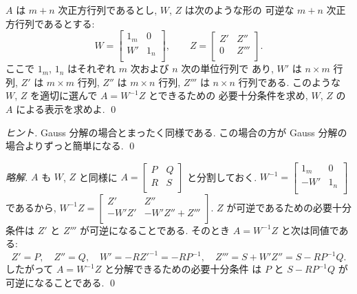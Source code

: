 \documentclass[12pt,twoside]{jarticle}
\newcommand\commentout[1]{#1}
\newcommand\commentout[1]{}
\begin{document}

\begin{question}
  \label{q:Gauss-decomp-2}
  $A$ は $m+n$ 次正方行列であるとし, $W$, $Z$ は次のような形の
  可逆な $m+n$ 次正方行列であるとする:
  \begin{equation*}
    W = 
    \begin{bmatrix}
      1_m & 0   \\
      W'  & 1_n \\
    \end{bmatrix},
    \qquad
    Z = 
    \begin{bmatrix}
      Z' & Z'' \\
      0  & Z''' \\
    \end{bmatrix}.
  \end{equation*}
  ここで $1_m$, $1_n$ はそれぞれ $m$ 次および $n$ 次の単位行列で
  あり, $W'$ は $n\times m$ 行列, $Z'$ は $m\times m$ 行列, 
  $Z''$ は $m\times n$ 行列, $Z'''$ は $n\times n$ 行列である.
  このような $W$, $Z$ を適切に選んで $A=W^{-1}Z$ とできるための
  必要十分条件を求め, $W$, $Z$ の $A$ による表示を求めよ.
  \qed
\end{question}

\begin{proof}[ヒント]
  Gauss 分解の場合とまったく同様である.
  この場合の方が Gauss 分解の場合よりずっと簡単になる.
  \qed
\end{proof}

\commentout{
\begin{proof}[略解]
  $A$ も $W$, $Z$ と同様に $A=
  \begin{bmatrix}
    P & Q \\
    R & S \\
  \end{bmatrix}$ と分割しておく.  $W^{-1}=
  \begin{bmatrix}
    1_m & 0 \\
    -W' & 1_n \\
  \end{bmatrix}$ であるから, $W^{-1}Z=
  \begin{bmatrix}
    Z'    & Z'' \\
    -W'Z' & -W'Z''+Z''' \\
  \end{bmatrix}$. 
  $Z$ が可逆であるための必要十分条件は $Z'$ と $Z'''$ が可逆になることである.
  そのとき $A=W^{-1}Z$ と次は同値である:
  \begin{equation*}
    Z'=P, \quad Z''=Q, \quad 
    W'=-RZ'^{-1}=-RP^{-1}, \quad
    Z'''=S+W'Z''=S-RP^{-1}Q.
  \end{equation*}
  したがって $A=W^{-1}Z$ と分解できるための必要十分条件
  は $P$ と $S-RP^{-1}Q$ が可逆になることである.
  \qed
\end{proof}
}
\end{document}
